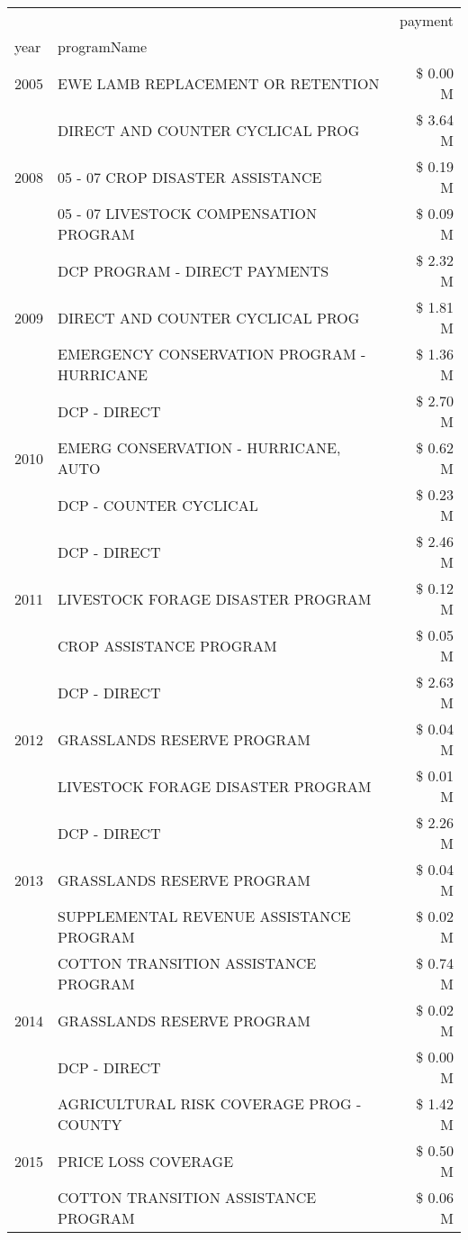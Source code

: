 \begin{tabular}{llr}
\toprule
 &  & payment \\
year & programName &  \\
\midrule
2005 & EWE LAMB REPLACEMENT OR RETENTION & \$ 0.00 M \\
\cline{1-3}
\multirow[t]{3}{*}{2008} & DIRECT AND COUNTER CYCLICAL PROG & \$ 3.64 M \\
 & 05 - 07 CROP DISASTER ASSISTANCE & \$ 0.19 M \\
 & 05 - 07 LIVESTOCK COMPENSATION PROGRAM & \$ 0.09 M \\
\cline{1-3}
\multirow[t]{3}{*}{2009} & DCP PROGRAM - DIRECT PAYMENTS & \$ 2.32 M \\
 & DIRECT AND COUNTER CYCLICAL PROG & \$ 1.81 M \\
 & EMERGENCY CONSERVATION PROGRAM - HURRICANE & \$ 1.36 M \\
\cline{1-3}
\multirow[t]{3}{*}{2010} & DCP - DIRECT & \$ 2.70 M \\
 & EMERG CONSERVATION - HURRICANE, AUTO & \$ 0.62 M \\
 & DCP - COUNTER CYCLICAL & \$ 0.23 M \\
\cline{1-3}
\multirow[t]{3}{*}{2011} & DCP - DIRECT & \$ 2.46 M \\
 & LIVESTOCK FORAGE DISASTER PROGRAM & \$ 0.12 M \\
 & CROP ASSISTANCE PROGRAM & \$ 0.05 M \\
\cline{1-3}
\multirow[t]{3}{*}{2012} & DCP - DIRECT & \$ 2.63 M \\
 & GRASSLANDS RESERVE PROGRAM & \$ 0.04 M \\
 & LIVESTOCK FORAGE DISASTER PROGRAM & \$ 0.01 M \\
\cline{1-3}
\multirow[t]{3}{*}{2013} & DCP - DIRECT & \$ 2.26 M \\
 & GRASSLANDS RESERVE PROGRAM & \$ 0.04 M \\
 & SUPPLEMENTAL REVENUE ASSISTANCE PROGRAM & \$ 0.02 M \\
\cline{1-3}
\multirow[t]{3}{*}{2014} & COTTON TRANSITION ASSISTANCE PROGRAM & \$ 0.74 M \\
 & GRASSLANDS RESERVE PROGRAM & \$ 0.02 M \\
 & DCP - DIRECT & \$ 0.00 M \\
\cline{1-3}
\multirow[t]{3}{*}{2015} & AGRICULTURAL RISK COVERAGE PROG - COUNTY & \$ 1.42 M \\
 & PRICE LOSS COVERAGE & \$ 0.50 M \\
 & COTTON TRANSITION ASSISTANCE PROGRAM & \$ 0.06 M \\

\end{tabular}
